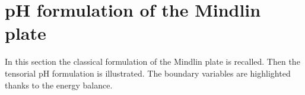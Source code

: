 \documentclass{ifacconf}
\begin{document}

\section{pH formulation of the Mindlin plate}

In this section the classical formulation of the Mindlin plate is recalled. Then the tensorial pH formulation is illustrated. The boundary variables are highlighted thanks to the energy balance.
 
\end{document}
